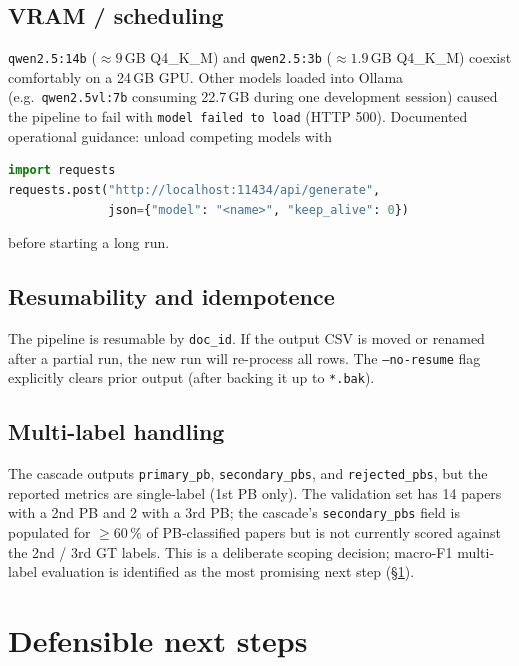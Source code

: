 \documentclass[11pt,a4paper]{article}
\begin{document}
\subsection{VRAM / scheduling}
\texttt{qwen2.5:14b} ($\approx 9$\,GB Q4\_K\_M) and \texttt{qwen2.5:3b} ($\approx 1.9$\,GB Q4\_K\_M) coexist comfortably on a 24\,GB GPU. Other models loaded into Ollama (e.g.\ \texttt{qwen2.5vl:7b} consuming 22.7\,GB during one development session) caused the pipeline to fail with \texttt{model failed to load} (HTTP 500). Documented operational guidance: unload competing models with
\begin{lstlisting}[language=Python,caption={Free VRAM before a long run}]
import requests
requests.post("http://localhost:11434/api/generate",
              json={"model": "<name>", "keep_alive": 0})
\end{lstlisting}
before starting a long run.

\subsection{Resumability and idempotence}
The pipeline is resumable by \texttt{doc\_id}. If the output CSV is moved or renamed after a partial run, the new run will re-process all rows. The \texttt{--no-resume} flag explicitly clears prior output (after backing it up to \texttt{*.bak}).

\subsection{Multi-label handling}
The cascade outputs \texttt{primary\_pb}, \texttt{secondary\_pbs}, and \texttt{rejected\_pbs}, but the reported metrics are single-label (1st PB only). The validation set has 14 papers with a 2nd PB and 2 with a 3rd PB; the cascade's \texttt{secondary\_pbs} field is populated for $\geq 60\,\%$ of PB-classified papers but is not currently scored against the 2nd / 3rd GT labels. This is a deliberate scoping decision; macro-F1 multi-label evaluation is identified as the most promising next step (\S\ref{sec:next}).

\section{Defensible next steps}\label{sec:next}
\end{document}

